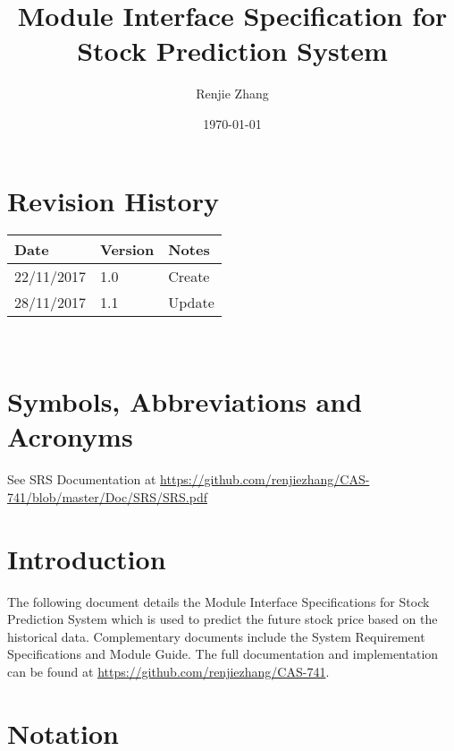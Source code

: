 \documentclass[12pt, titlepage]{article}
\begin{document}
\title{Module Interface Specification for Stock Prediction System}

\author{Renjie Zhang}

\date{\today}

\maketitle


\section{Revision History}

\begin{tabularx}{\textwidth}{p{3cm}p{2cm}X}
\toprule {\bf Date} & {\bf Version} & {\bf Notes}\\
\midrule
22/11/2017 & 1.0 & Create\\
28/11/2017 & 1.1 & Update\\
\bottomrule
\end{tabularx}

~\newpage

\section{Symbols, Abbreviations and Acronyms}

See SRS Documentation at \url{https://github.com/renjiezhang/CAS-741/blob/master/Doc/SRS/SRS.pdf}

\newpage

\tableofcontents

\newpage


\section{Introduction}

The following document details the Module Interface Specifications for
Stock Prediction System which is used to predict the future stock price based on the historical data. Complementary documents include the System Requirement Specifications
and Module Guide. The full documentation and implementation can be
found at \url{https://github.com/renjiezhang/CAS-741}.\\

\section{Notation}
\end{document}
